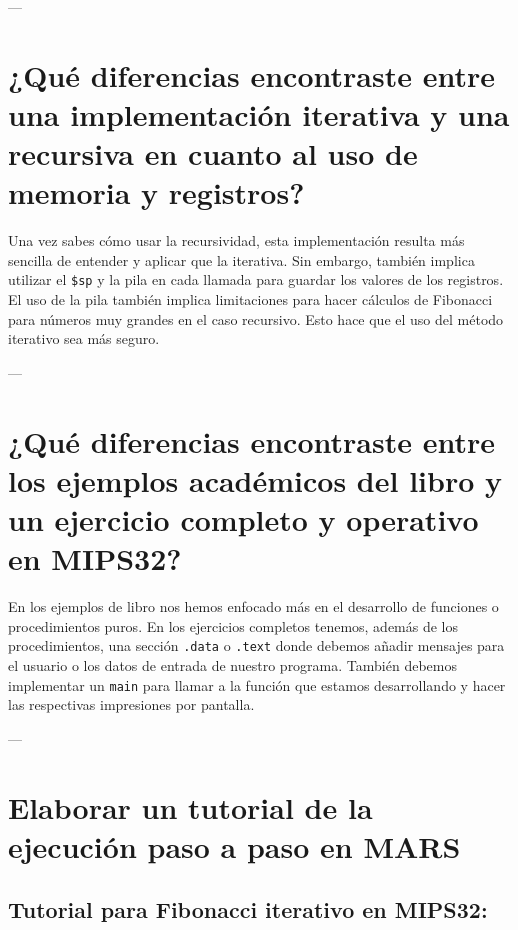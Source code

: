 \documentclass{article}
\begin{document}
---

\section*{¿Qué diferencias encontraste entre una implementación iterativa y una recursiva en cuanto al uso de memoria y registros?}

Una vez sabes cómo usar la recursividad, esta implementación resulta más sencilla de entender y aplicar que la iterativa. Sin embargo, también implica utilizar el \texttt{\$sp} y la pila en cada llamada para guardar los valores de los registros. El uso de la pila también implica limitaciones para hacer cálculos de Fibonacci para números muy grandes en el caso recursivo. Esto hace que el uso del método iterativo sea más seguro.

---

\section*{¿Qué diferencias encontraste entre los ejemplos académicos del libro y un ejercicio completo y operativo en MIPS32?}

En los ejemplos de libro nos hemos enfocado más en el desarrollo de funciones o procedimientos puros. En los ejercicios completos tenemos, además de los procedimientos, una sección \texttt{.data} o \texttt{.text} donde debemos añadir mensajes para el usuario o los datos de entrada de nuestro programa. También debemos implementar un \texttt{main} para llamar a la función que estamos desarrollando y hacer las respectivas impresiones por pantalla.

---

\section*{Elaborar un tutorial de la ejecución paso a paso en MARS}

\subsection*{Tutorial para Fibonacci iterativo en MIPS32:}
\end{document}

